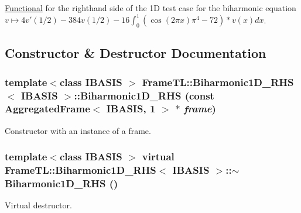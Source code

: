 \hyperlink{classFrameTL_1_1Functional}{Functional} for the righthand side of the 1D test case for the biharmonic equation $ v \mapsto 4v'(1/2) - 384v(1/2) - 16 \int_0^1 (\cos(2\pi x)\pi^4-72) * v(x) dx$. 

\subsection{Constructor \& Destructor Documentation}
\hypertarget{classFrameTL_1_1Biharmonic1D__RHS_c9600ba95f7c01ef6080a4372e0d3031}{
\subsubsection[{Biharmonic1D\_\-RHS}]{\setlength{\rightskip}{0pt plus 5cm}template$<$class IBASIS $>$ {\bf FrameTL::Biharmonic1D\_\-RHS}$<$ IBASIS $>$::{\bf Biharmonic1D\_\-RHS} (const {\bf AggregatedFrame}$<$ IBASIS, 1 $>$ $\ast$ {\em frame})}}
\label{classFrameTL_1_1Biharmonic1D__RHS_c9600ba95f7c01ef6080a4372e0d3031}


Constructor with an instance of a frame. \hypertarget{classFrameTL_1_1Biharmonic1D__RHS_4b3957bc2e77d88486b21916c7a74030}{
\subsubsection[{$\sim$Biharmonic1D\_\-RHS}]{\setlength{\rightskip}{0pt plus 5cm}template$<$class IBASIS $>$ virtual {\bf FrameTL::Biharmonic1D\_\-RHS}$<$ IBASIS $>$::$\sim${\bf Biharmonic1D\_\-RHS} ()}}
\label{classFrameTL_1_1Biharmonic1D__RHS_4b3957bc2e77d88486b21916c7a74030}


Virtual destructor. 

